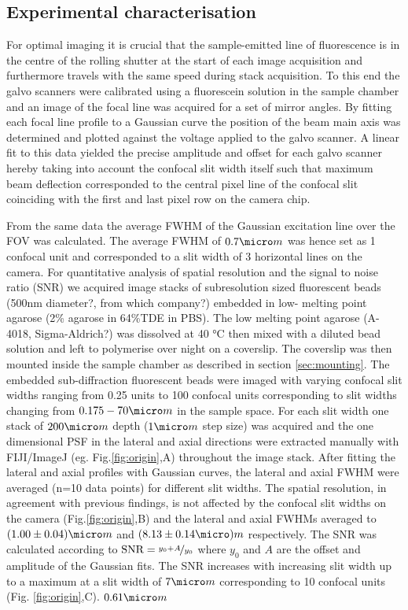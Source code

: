 \documentclass[12pt]{spieman}  %
\begin{document}
\subsection{Experimental characterisation}

For optimal imaging it is crucial that the sample-emitted line of fluorescence is in the centre of the rolling shutter at the start of each image acquisition and furthermore travels with the same speed during stack acquisition. To this end the galvo scanners were calibrated using a fluorescein solution in the sample chamber and an image of the focal line was acquired for a set of mirror angles. By fitting each focal line profile to a Gaussian curve the position of the beam main axis was determined and plotted against the voltage applied to the galvo scanner. A linear fit to this data yielded the precise amplitude and offset for each galvo scanner hereby taking into account the confocal slit width itself such that maximum beam deflection corresponded to the central pixel line of the confocal slit coinciding with the first and last pixel row on the camera chip. 

From the same data the average FWHM of the Gaussian excitation line over the FOV was calculated. The average FWHM of $0.7\micro m$ was hence set as 1 confocal unit and corresponded to a slit width of 3 horizontal lines on the camera. For quantitative analysis of spatial resolution and the signal to noise ratio (SNR) we acquired image stacks of subresolution sized fluorescent beads (500nm diameter?, from which company?) embedded in low- melting point agarose (2\% agarose in 64\%TDE in PBS). The low melting point agarose (A-4018, Sigma-Aldrich?) was dissolved at 40 °C then mixed with a diluted bead solution and left to polymerise over night on a coverslip. The coverslip was then mounted inside the sample chamber as described in section \ref{sec:mounting}. The embedded sub-diffraction fluorescent beads were imaged with varying confocal slit widths ranging from 0.25 units to 100 confocal units corresponding to slit widths changing from $0.175-70 \micro m$ in the sample space. For each slit width one stack of $200\micro m$ depth ($1 \micro m$ step size) was acquired and the one dimensional PSF in the lateral and axial directions were extracted manually with FIJI/ImageJ (eg. Fig.\ref{fig:origin},A) throughout the image stack. After fitting the lateral and axial profiles with Gaussian curves, the lateral and axial FWHM were averaged (n=10 data points) for different slit widths. The spatial resolution, in agreement with previous findings\cite{Wilson1987,Cox2004}, is not affected by the confocal slit widths on the camera (Fig.\ref{fig:origin},B) and the lateral and axial FWHMs averaged to $(1.00\pm0.04) \micro m$ and $(8.13\pm0.14 \micro) m$ respectively. The SNR was calculated according to $\text{SNR} = \nicefrac{y_0 + A}{y_0}$ where $y_0$ and $A$ are the offset and amplitude of the Gaussian fits. The SNR increases with increasing slit width up to a maximum at a slit width of $7 \micro m$ corresponding to 10 confocal units (Fig. \ref{fig:origin},C).   
$0.61 \micro m$
\end{document}

